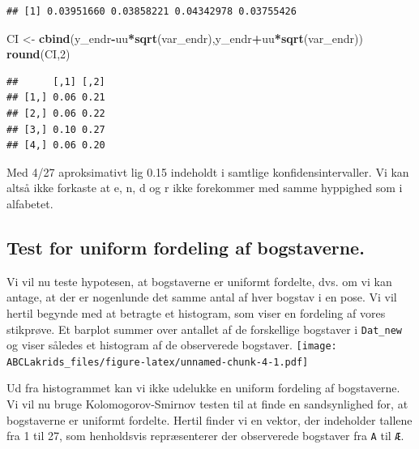 \documentclass[]{article}
\newenvironment{Shaded}{\begin{snugshade}}{\end{snugshade}}
\newcommand{\KeywordTok}[1]{\textcolor[rgb]{0.13,0.29,0.53}{\textbf{#1}}}
\newcommand{\DecValTok}[1]{\textcolor[rgb]{0.00,0.00,0.81}{#1}}
\newcommand{\StringTok}[1]{\textcolor[rgb]{0.31,0.60,0.02}{#1}}
\newcommand{\OperatorTok}[1]{\textcolor[rgb]{0.81,0.36,0.00}{\textbf{#1}}}
\newcommand{\NormalTok}[1]{#1}
\begin{document}
\begin{verbatim}
## [1] 0.03951660 0.03858221 0.04342978 0.03755426
\end{verbatim}

\begin{Shaded}
\begin{Highlighting}[]
\NormalTok{CI <-}\StringTok{ }\KeywordTok{cbind}\NormalTok{(y_endr}\OperatorTok{-}\NormalTok{uu}\OperatorTok{*}\KeywordTok{sqrt}\NormalTok{(var_endr),y_endr}\OperatorTok{+}\NormalTok{uu}\OperatorTok{*}\KeywordTok{sqrt}\NormalTok{(var_endr))}
\KeywordTok{round}\NormalTok{(CI,}\DecValTok{2}\NormalTok{)}
\end{Highlighting}
\end{Shaded}

\begin{verbatim}
##      [,1] [,2]
## [1,] 0.06 0.21
## [2,] 0.06 0.22
## [3,] 0.10 0.27
## [4,] 0.06 0.20
\end{verbatim}

Med 4/27 aproksimativt lig 0.15 indeholdt i samtlige
konfidensintervaller. Vi kan altså ikke forkaste at e, n, d og r ikke
forekommer med samme hyppighed som i alfabetet.

\subsection{Test for uniform fordeling af
bogstaverne.}\label{test-for-uniform-fordeling-af-bogstaverne.}

Vi vil nu teste hypotesen, at bogstaverne er uniformt fordelte, dvs. om
vi kan antage, at der er nogenlunde det samme antal af hver bogstav i en
pose. Vi vil hertil begynde med at betragte et histogram, som viser en
fordeling af vores stikprøve. Et barplot summer over antallet af de
forskellige bogstaver i \texttt{Dat\_new} og viser således et histogram
af de observerede bogstaver.
\texttt{[image: ABCLakrids\_files/figure-latex/unnamed-chunk-4-1.pdf]}

Ud fra histogrammet kan vi ikke udelukke en uniform fordeling af
bogstaverne. Vi vil nu bruge Kolomogorov-Smirnov testen til at finde en
sandsynlighed for, at bogstaverne er uniformt fordelte. Hertil finder vi
en vektor, der indeholder tallene fra 1 til 27, som henholdsvis
repræsenterer der observerede bogstaver fra \texttt{A} til \texttt{Æ}.
\end{document}
